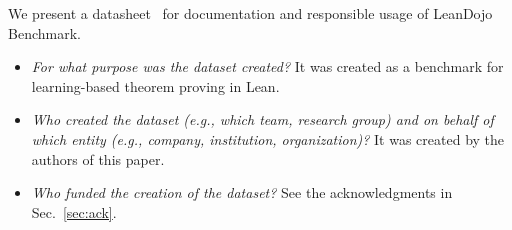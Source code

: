 We present a datasheet~\cite{gebru2021datasheets} for documentation and responsible usage of LeanDojo Benchmark.



\begin{itemize}[leftmargin=*]
\item \emph{For what purpose was the dataset created?} It was created as a benchmark for learning-based theorem proving in Lean.

\item \emph{Who created the dataset (e.g., which team, research group) and on behalf of which entity (e.g., company, institution, organization)?} It was created by the authors of this paper.

\item \emph{Who funded the creation of the dataset?} See the acknowledgments in Sec.~\ref{sec:ack}.

\end{itemize}


